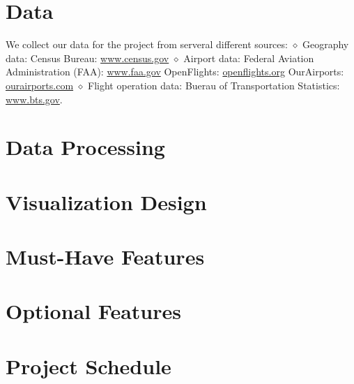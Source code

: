 \documentclass[12pt]{article}
\begin{document}
\section{Data}
    We collect our data for the project from serveral different sources:
    $\diamond$ Geography data:
    Census Bureau: \url{www.census.gov}
    $\diamond$ Airport data: 
    Federal Aviation Administration (FAA): \url{www.faa.gov}
    OpenFlights: \url{openflights.org}
    OurAirports: \url{ourairports.com}
    $\diamond$ Flight operation data: 
    Buerau of Transportation Statistics: \url{www.bts.gov}.
    
\section{Data Processing}

\section{Visualization Design}
\section{Must-Have Features}
\section{Optional Features}
\section{Project Schedule}
\end{document}
